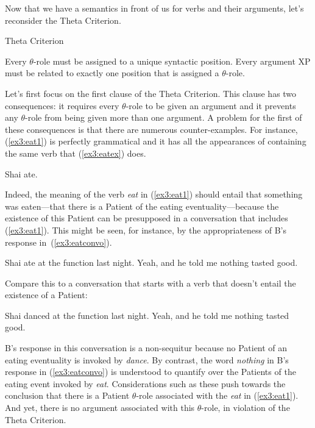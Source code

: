 Now that we have a semantics in front of us for verbs and their arguments, let's reconsider the Theta Criterion.
\begin{exe}
	\raggedright
	 Theta Criterion
	\begin{xlist}
		\ex Every $\theta$-role must be assigned to a unique syntactic position.
		\ex Every argument XP must be related to exactly one position that is assigned a $\theta$-role.
	\end{xlist}
\end{exe}
Let's first focus on the first clause of the Theta Criterion. This clause has two consequences: it requires every $\theta$-role to be given an argument and it prevents any $\theta$-role from being given more than one argument. A problem for the first of these consequences is that there are numerous counter-examples. For instance, (\ref{ex3:eat1}) is perfectly grammatical and it has all the appearances of containing the same verb that (\ref{ex3:eatex}) does.
\begin{exe}
	\raggedright
	\ex \label{ex3:eat1} 
	Shai ate.
\end{exe}
Indeed, the meaning of the verb \emph{eat} in (\ref{ex3:eat1}) should entail that something was eaten---that there is a Patient of the eating eventuality---because the existence of this Patient can be presupposed in a conversation that includes (\ref{ex3:eat1}). This might be seen, for instance, by the appropriateness of B's response in~(\ref{ex3:eatconvo}).
\begin{exe}
	\raggedright
	\ex \label{ex3:eatconvo} 
	\begin{xlist}
		 Shai ate at the function last night.
		 Yeah, and he told me nothing tasted good.
	\end{xlist}
\end{exe}
Compare this to a conversation that starts with a verb that doesn't entail the existence of a Patient:
\begin{exe}
	\raggedright
	\ex \label{ex3:neatconvo} 
	\begin{xlist}
		 Shai danced at the function last night.
		 Yeah, and he told me nothing tasted good.
	\end{xlist}
\end{exe}
B's response in this conversation is a non-sequitur because no Patient of an eating eventuality is invoked by \emph{dance}. By contrast, the word \emph{nothing} in B's response in (\ref{ex3:eatconvo}) is understood to quantify over the Patients of the eating event invoked by \emph{eat}. Considerations such as these push towards the conclusion that there is a Patient $\theta$-role associated with the \emph{eat} in (\ref{ex3:eat1}). And yet, there is no argument associated with this $\theta$-role, in violation of the Theta Criterion.

